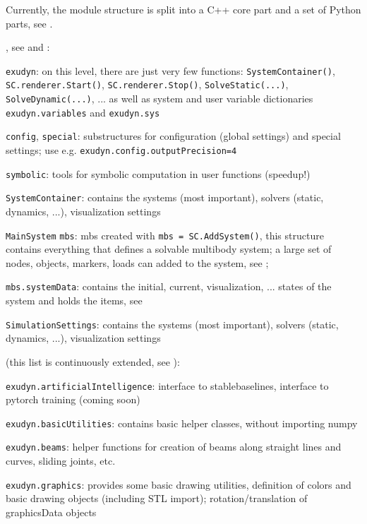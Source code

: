 Currently, the \codeName module structure is split into a C++ core part and a set of 
Python parts, see .
\bi
  \item {}, see  and :
  \bi
    \item[--] \texttt{exudyn}:
    on this level, there are just very few functions: \texttt{SystemContainer()}, \texttt{SC.renderer.Start()}, \texttt{SC.renderer.Stop()}, \texttt{SolveStatic(...)}, \texttt{SolveDynamic(...)}, ... as well as system and user variable dictionaries \texttt{exudyn.variables} and \texttt{exudyn.sys}
    \item[--] \texttt{config}, \texttt{special}: substructures for configuration (global settings) and special settings; use e.g. \texttt{exudyn.config.outputPrecision=4}
    \item[--] \texttt{symbolic}: tools for symbolic computation in user functions (speedup!)
    \item[--] \texttt{SystemContainer}: contains the systems (most important), solvers (static, dynamics, ...), visualization settings
    \item[--] \texttt{MainSystem} \texttt{mbs}: \acf{mbs} created with \texttt{mbs = SC.AddSystem()}, this structure contains everything that defines a solvable multibody system; a large set of nodes, objects, markers, 
    loads can added to the system, see ;
    \item[--] \texttt{mbs.systemData}: contains the initial, current, visualization, ... states of the system and holds the items, see 
    \item[--] \texttt{SimulationSettings}: contains the systems (most important), solvers (static, dynamics, ...), visualization settings
  \ei
  \item {} (this list is continuously extended, see ):
  \bi
    \item[--] \texttt{exudyn.artificialIntelligence}: interface to stablebaselines, interface to pytorch training (coming soon)
    \item[--] \texttt{exudyn.basicUtilities}: contains basic helper classes, without importing numpy
    \item[--] \texttt{exudyn.beams}: helper functions for creation of beams along straight lines and curves, sliding joints, etc.
    \item[--] \texttt{exudyn.graphics}: provides some basic drawing utilities, definition of colors and basic drawing objects (including \acs{STL} import); rotation/translation of graphicsData objects

